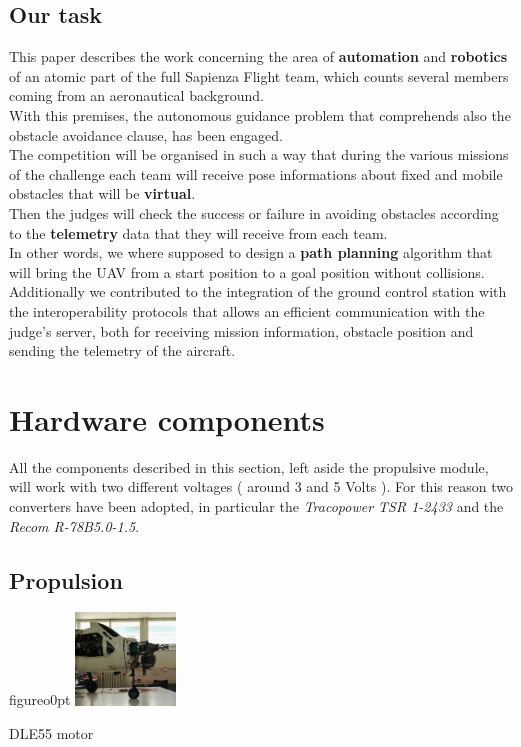 \documentclass[oneside,onecolumn]{article}
\begin{document}
\subsection{Our task}
This paper describes the work concerning the area of \textbf{automation} and
\textbf{robotics} of an atomic part of the full Sapienza Flight team, which
counts several members coming from an aeronautical background.\\
With this premises, the autonomous guidance problem that comprehends also the obstacle avoidance clause, has been engaged.\\
The competition will be organised in such a way that during the various missions
of the challenge each team will receive pose informations about fixed and mobile
obstacles that will be \textbf{virtual}.\\
Then the judges will check the success or failure in avoiding obstacles
according to the \textbf{telemetry} data that they will receive from each team.\\
In other words, we where supposed to design a \textbf{path planning} algorithm
that will bring the UAV from a start position to a goal position without
collisions.\\
Additionally we contributed to the integration of the ground control station
with the interoperability protocols that allows an efficient communication with
the judge's server, both for receiving mission information, obstacle position
and sending the telemetry of the aircraft.


\section{Hardware components}
All the components described in this section, left aside the propulsive module,
will work with two different voltages ( around 3 and 5 Volts ). For this reason
two converters have been adopted, in particular the \textit{Tracopower TSR 1-2433
 } and the \textit{Recom R-78B5.0-1.5}.
\subsection{Propulsion}
\begin{wrapfloat}{figure}{o}{0pt}
  \includegraphics[width=0.2\textwidth]{YAK3}
  \caption{DLE55 motor}\label{wrap-fig:2}
\end{wrapfloat} 
\end{document}
